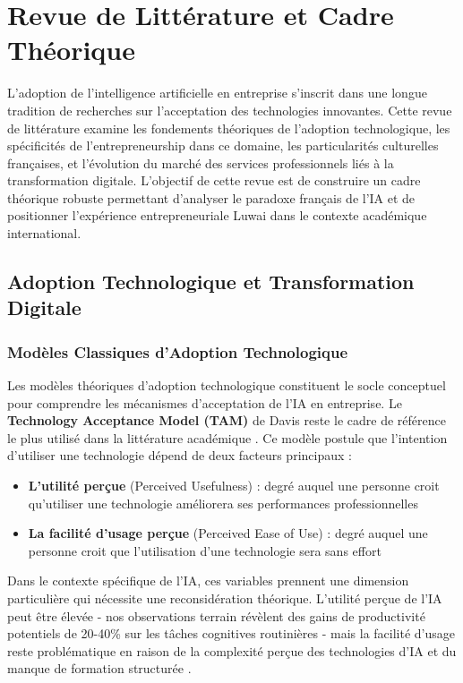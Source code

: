\chapter{Revue de Littérature et Cadre Théorique}
\label{chap:literature_review}

L'adoption de l'intelligence artificielle en entreprise s'inscrit dans une longue tradition de recherches sur l'acceptation des technologies innovantes. Cette revue de littérature examine les fondements théoriques de l'adoption technologique, les spécificités de l'entrepreneurship dans ce domaine, les particularités culturelles françaises, et l'évolution du marché des services professionnels liés à la transformation digitale. L'objectif de cette revue est de construire un cadre théorique robuste permettant d'analyser le paradoxe français de l'IA et de positionner l'expérience entrepreneuriale Luwai dans le contexte académique international.

\section{Adoption Technologique et Transformation Digitale}

\subsection{Modèles Classiques d'Adoption Technologique}

Les modèles théoriques d'adoption technologique constituent le socle conceptuel pour comprendre les mécanismes d'acceptation de l'IA en entreprise. Le \textbf{Technology Acceptance Model (TAM)} de Davis \cite{davis1989perceived} reste le cadre de référence le plus utilisé dans la littérature académique \cite{artimon2025theorie}. Ce modèle postule que l'intention d'utiliser une technologie dépend de deux facteurs principaux :

\begin{itemize}
    \item \textbf{L'utilité perçue} (Perceived Usefulness) : degré auquel une personne croit qu'utiliser une technologie améliorera ses performances professionnelles
    \item \textbf{La facilité d'usage perçue} (Perceived Ease of Use) : degré auquel une personne croit que l'utilisation d'une technologie sera sans effort
\end{itemize}

Dans le contexte spécifique de l'IA, ces variables prennent une dimension particulière qui nécessite une reconsidération théorique. L'utilité perçue de l'IA peut être élevée - nos observations terrain révèlent des gains de productivité potentiels de 20-40\% sur les tâches cognitives routinières - mais la facilité d'usage reste problématique en raison de la complexité perçue des technologies d'IA et du manque de formation structurée \cite{psicosmart2024resistance}.

